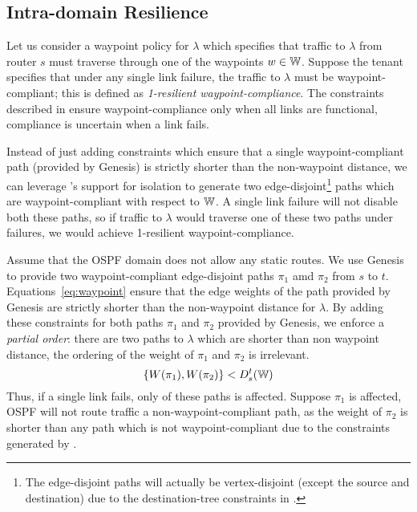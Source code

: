 \subsection{Intra-domain Resilience} \label{sec:ospfresilience}
Let us consider a waypoint policy for $\lambda$ which
specifies that traffic to $\lambda$ from router $s$ 
must traverse through
one of the waypoints $w \in \mathbb{W}$. Suppose the tenant 
specifies that under any single link failure, the traffic 
to $\lambda$ must be waypoint-compliant; this is defined 
as \emph{1-resilient waypoint-compliance}. The constraints 
described in  ensure waypoint-compliance
only when all links are functional, compliance is uncertain
when a link fails.   

Instead of just adding constraints which ensure that a single 
waypoint-compliant path (provided by Genesis) is strictly 
shorter than the non-waypoint distance, we can leverage \genesis's
support for isolation to generate two edge-disjoint\footnote
{The edge-disjoint paths will actually be vertex-disjoint (except the 
	source and destination) due to the destination-tree constraints
	in \genesis.} paths
which are waypoint-compliant with respect to $\mathbb{W}$. A single link
failure will not disable both these paths, so if traffic to $\lambda$ 
would 
traverse one of these two paths under failures, 
we would achieve 1-resilient
waypoint-compliance. 

Assume that the OSPF domain does not allow any static routes. 
We use Genesis to provide two waypoint-compliant 
edge-disjoint paths $\pi_1$ amd $\pi_2$ from $s$ to $t$.
Equations~\ref{eq:waypoint} ensure that the edge weights 
of the path provided by Genesis are strictly shorter than 
the non-waypoint distance for $\lambda$. By adding these
constraints for both paths $\pi_1$ and $\pi_2$ provided by Genesis,
we enforce a \emph{partial order}: there are two paths to $\lambda$
which are shorter than non waypoint distance, the 
ordering of the weight of $\pi_1$ and $\pi_2$ is irrelevant. 
\[
\{ W(\pi_1), W(\pi_2) \} < D^t_s(\mathbb{W}) 
\]  
Thus, if a single link fails, only of these paths is affected. Suppose
$\pi_1$ is affected, OSPF will not route traffic a  
non-waypoint-compliant path, as the weight of $\pi_2$ is shorter than any path which is not waypoint-compliant due to the constraints generated 
by \name.

